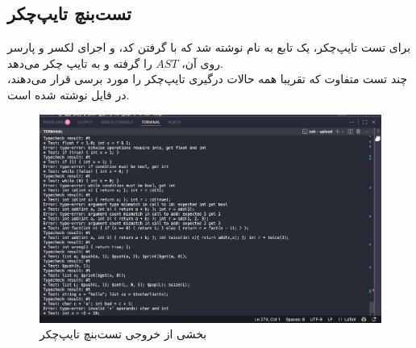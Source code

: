 \documentclass{article}
\begin{document}
\subsection{تست‌بنچ تایپ‌چکر}
برای تست تایپ‌چکر، یک تابع 
به نام
نوشته شد که با گرفتن کد، و اجرای لکسر و پارسر روی آن، 
$AST$
را گرفته و به تایپ چکر می‌دهد.
\\
چند تست متفاوت که تقریبا همه حالات درگیری تایپ‌چکر را مورد برسی قرار می‌دهند، در فایل 
\texttt{}
نوشته شده است.
\begin{figure}[h]
           \centering
        \includegraphics[width=1\linewidth]{pics/tbtc.png}
        \caption{بخشی از خروجی تست‌بنچ تایپ‌چکر}
\end{figure}
\end{document}
